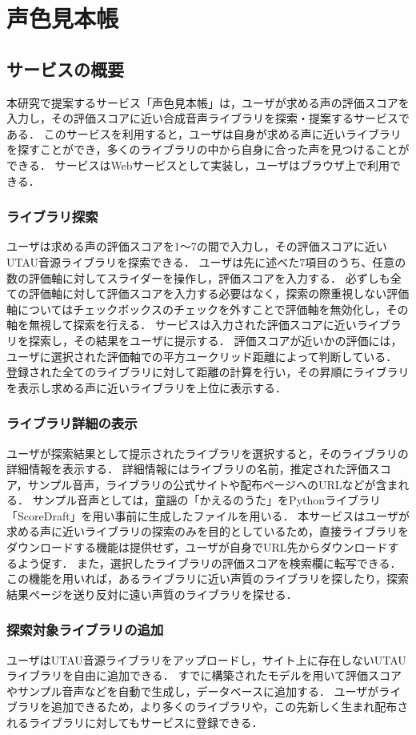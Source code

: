 \chapter{声色見本帳}
\thispagestyle{myheadings}

\section{サービスの概要}
本研究で提案するサービス「声色見本帳」は，ユーザが求める声の評価スコアを入力し，その評価スコアに近い合成音声ライブラリを探索・提案するサービスである．
このサービスを利用すると，ユーザは自身が求める声に近いライブラリを探すことができ，多くのライブラリの中から自身に合った声を見つけることができる．
サービスはWebサービスとして実装し，ユーザはブラウザ上で利用できる．

\subsection{ライブラリ探索}
ユーザは求める声の評価スコアを1〜7の間で入力し，その評価スコアに近いUTAU音源ライブラリを探索できる．
ユーザは先に述べた7項目のうち、任意の数の評価軸に対してスライダーを操作し，評価スコアを入力する．
必ずしも全ての評価軸に対して評価スコアを入力する必要はなく，探索の際重視しない評価軸についてはチェックボックスのチェックを外すことで評価軸を無効化し，その軸を無視して探索を行える．
サービスは入力された評価スコアに近いライブラリを探索し，その結果をユーザに提示する．
評価スコアが近いかの評価には，ユーザに選択された評価軸での平方ユークリッド距離によって判断している．
登録された全てのライブラリに対して距離の計算を行い，その昇順にライブラリを表示し求める声に近いライブラリを上位に表示する．

\subsection{ライブラリ詳細の表示}
ユーザが探索結果として提示されたライブラリを選択すると，そのライブラリの詳細情報を表示する．
詳細情報にはライブラリの名前，推定された評価スコア，サンプル音声，ライブラリの公式サイトや配布ページへのURLなどが含まれる．
サンプル音声としては，童謡の「かえるのうた」をPythonライブラリ「ScoreDraft」を用い事前に生成したファイルを用いる．
本サービスはユーザが求める声に近いライブラリの探索のみを目的としているため，直接ライブラリをダウンロードする機能は提供せず，ユーザが自身でURL先からダウンロードするよう促す．
また，選択したライブラリの評価スコアを検索欄に転写できる．
この機能を用いれば，あるライブラリに近い声質のライブラリを探したり，探索結果ページを送り反対に遠い声質のライブラリを探せる．

\subsection{探索対象ライブラリの追加}
ユーザはUTAU音源ライブラリをアップロードし，サイト上に存在しないUTAUライブラリを自由に追加できる．
すでに構築されたモデルを用いて評価スコアやサンプル音声などを自動で生成し，データベースに追加する．
ユーザがライブラリを追加できるため，より多くのライブラリや，この先新しく生まれ配布されるライブラリに対してもサービスに登録できる．

